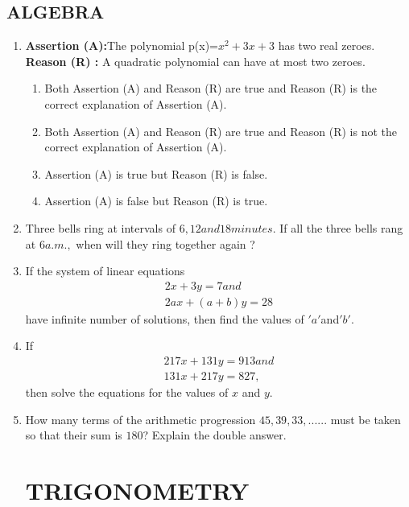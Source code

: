 \documentclass[12pt,-letter paper]{article}
\providecommand{\brak}[1]{\ensuremath{\left(#1\right)}}
\begin{document}
\begin{center}
    \section*{ALGEBRA}
\end{center}
\begin{enumerate}
\item \textbf{Assertion (A):}The polynomial p(x)=$x^{2}+3x+3$ has two real zeroes.
	\\\textbf{Reason (R) :} A quadratic polynomial can have at most two zeroes.
\begin{enumerate}
\item Both Assertion (A) and Reason (R) are true and Reason (R) is the correct explanation of Assertion (A). 
\item Both Assertion (A) and Reason (R) are true and Reason (R) is not the correct explanation of Assertion (A).
\item Assertion (A) is true but Reason (R) is false.
\item Assertion (A) is false but Reason (R) is true.
\end{enumerate}

\item Three bells ring at intervals of $ 6, 12 and 18 minutes$. If all the three bells rang at $ 6 a.m.,$ when will they ring together again ?

\item If the system of linear equations  \\ 		
\begin{align}
		2x + 3y = 7 and \\ 
		2ax + \brak{a+b}y = 28
\end{align}
\text have infinite number of solutions, then find the values of $' a '$and$' b '$.

\item If
\begin{align}
	 217x + 131y = 913 and \\
         131x + 217y = 827,
\end{align}
 then solve the equations for the values of $x$ and $y$.

\item How many terms of the arithmetic progression $45,39,33,......$ must be taken so that their sum is $180$? Explain the double answer.

\begin{center}
    \section*{TRIGONOMETRY}
\end{center}


\end{enumerate}
\end{document}

